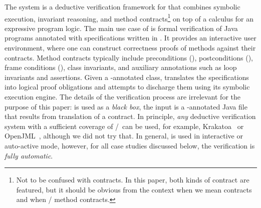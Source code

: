 The {\KeY} system \cite{DBLP:series/lncs/10001,KeYTutorial24} is a
deductive verification framework for {\Java} that combines symbolic
execution, invariant reasoning, and method contracts\footnote{Not to
  be confused with {\Stipula} contracts. In this paper, both kinds of
  contract are featured, but it should be obvious from the context
  when we mean {\Stipula} contracts and when {\JML}/{\Java} method
  contracts.} on top of a calculus for an expressive program logic.
%
The main use case of {\KeY} is formal verification of Java programs
annotated with specifications written in {\JML}. 
It provides an interactive user environment, where one can
construct correctness proofs of {\Java} methods against their {\JML}
contracts. Method contracts typically include preconditions
(), postconditions (), frame
conditions (), class invariants, and auxiliary
annotations such as loop invariants and assertions. Given a
{\JML}-annotated {\Java} class, {\KeY} translates the specifications into
logical proof obligations and attempts to discharge them using its
symbolic execution engine.
%
The details of the verification process are irrelevant for the purpose
of this paper: {\KeY} is used as a \emph{black box}, the input is a
{\JML}-annotated Java file that results from translation of a
{\Stipula} contract. In principle, \emph{any} deductive verification
system with a sufficient coverage of \JML/\Java\ can be used, for
example, Krakatoa~\cite{Krakatoa07} or OpenJML~\cite{Cok21}, although
we did not try that.  In general, {\KeY} is used in interactive or
auto-active mode, however, for all case studies discussed below, the
verification is \emph{fully automatic}.

